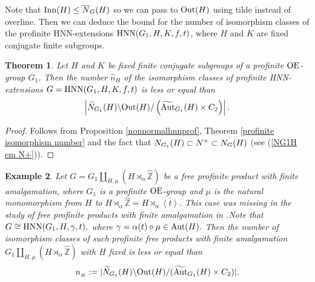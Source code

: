 \documentclass[a4paper,12pt]{article}
\newtheorem{thm}{Theorem}[section]
\newcommand{\Z}{\mathbb{Z}}
\def\OE{{\rm OE}}
\def\aut {{\rm Aut}}
\def\out {{\rm Out}}
\def\inn {{\rm Inn}}
\def\hnn {{\rm HNN}}
\def\Z{{\mathbb Z}}
\newtheorem{exa}[thm]{Example}
\begin{document}
{%



Note that $\inn(H)\leq \overline{N}_{G}(H)$ so we can pass to $\out(H)$ using tilde instead of overline. Then we can deduce the bound  for the number  of isomorphism classes of the profinite HNN-extensions $\hnn(G_1, H, K, f, t)$, where $H$ and $K$ are fixed conjugate finite subgroups. 

\begin{thm}\label{profinite isomorphisms} Let $H$ and $K$ be fixed finite conjugate subgroups of a profinite $\OE$-group $G_1$. Then the number $\hat n_H$ of the isomorphism classes of profinite HNN-extensions $G=\hnn(G_1, H, K, f, t)$ is less or equal than $$\left| \widetilde N_{G_1}(H) \backslash \out(H)/ \left( \widetilde{\aut}_{G_1}(H) \times C_2\right) \right|.$$
\end{thm}
\begin{proof}
Follows from Proposition \ref{nonnormalhnnprof}, Theorem \ref{profinite isomorphism number} and the fact that $N_{G_1}(H)\\ \subset N^{+} \subset N_{G}(H)$ (see (\ref{NG1H em N+})).  
\end{proof}


\begin{exa} Let $G= G_1\amalg_{H, \mu} (H\rtimes_{\alpha} \widehat\Z)$ be a  free profinite product with finite amalgamation, where $G_1$ is a profinite $\OE$-group and $\mu$ is the natural monomorphism from $H$ to $H\rtimes_{\alpha} \widehat\Z= H\rtimes_{\alpha} \overline{\left\langle t \right\rangle}.$ This case was missing in the study of free profinite products with finite amalgamation in \cite{BPZ2} .Note that $G\cong \hnn(G_1, H, \gamma, t),$ where $\gamma = \alpha(t)\circ \mu \in \aut(H).$ Then the number of isomorphism classes of such profinite free products with finite amalgamation $G_1\amalg_{H, \mu} (H\rtimes_{\alpha} \widehat\Z)$  with $H$ fixed is less or equal than  
$$n_{_{H}}:=| \widetilde{N}_{G_1}(H) \backslash \out(H)/ ( \widetilde{\aut}_{G_1}(H) \times C_2) |.$$
\end{exa}


}
\end{document}
